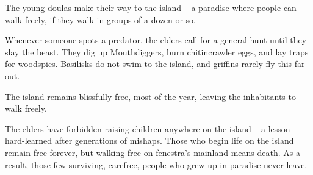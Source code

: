 \begin{multicols}{2}
\begin{exampletext}
  The young \glspl{doula} make their way to the island -- a paradise where people can walk freely, if they walk in groups of a dozen or so.

  Whenever someone spots a predator, the elders call for a general hunt until they slay the beast.
  They dig up Mouthdiggers, burn chitincrawler eggs, and lay traps for woodspies.
  Basilisks do not swim to the island, and griffins rarely fly this far out.

  The island remains blissfully free, most of the year, leaving the inhabitants to walk freely.

  The elders have forbidden raising children anywhere on the island -- a lesson hard-learned after generations of mishaps.
  Those who begin life on the island remain free forever, but walking free on \gls{fenestra}'s mainland means death.
  As a result, those few surviving, carefree, people who grew up in paradise never leave.
\end{exampletext}

\end{multicols}


